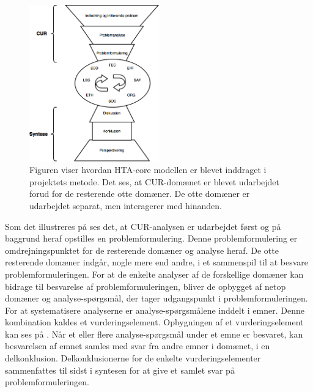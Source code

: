 \begin{figure}[H] 
	\begin{center}
		\includegraphics[width=0.5\textwidth]{figures/cMetode/metode}
	\end{center}
	\caption{Figuren viser hvordan HTA-core modellen er blevet inddraget i projektets metode. Det ses, at CUR-domænet er blevet udarbejdet forud for de resterende otte domæner. De otte domæner er udarbejdet separat, men interagerer med hinanden.} 
	\label{fig:metode} 
\end{figure}

Som det illustreres på  ses det, at CUR-analysen er udarbejdet først og på baggrund heraf opstilles en problemformulering. Denne problemformulering er omdrejningspunktet for de resterende domæner og analyse heraf. De otte resterende domæner indgår, nogle mere end andre, i et sammenspil til at besvare problemformuleringen. For at de enkelte analyser af de forskellige domæner kan bidrage til besvarelse af problemformuleringen, bliver de opbygget af netop domæner og analyse-spørgsmål, der tager udgangspunkt i problemformuleringen. For at systematisere analyserne er analyse-spørgsmålene inddelt i emner. Denne kombination kaldes et vurderingselement. Opbygningen af et vurderingselement kan ses på . Når et eller flere analyse-spørgsmål under et emne er besvaret, kan besvarelsen af emnet samles med svar fra andre emner i domænet, i en delkonklusion. Delkonklusionerne for de enkelte vurderingselementer sammenfattes til sidst i syntesen for at give et samlet svar på problemformuleringen.\citep{HTAcore}


